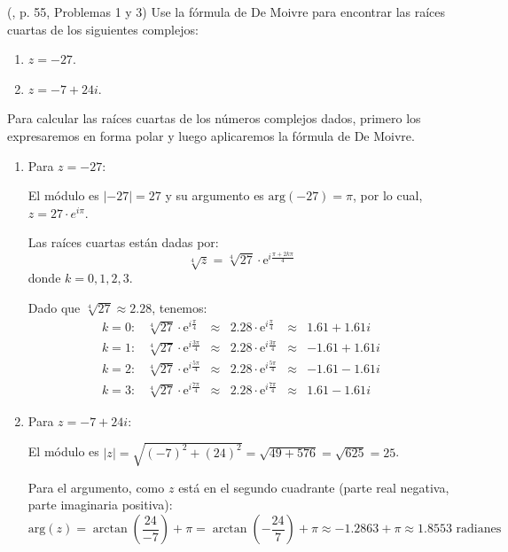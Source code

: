 \begin{prob}  (\cite{andreescu2014complex}, p. 55, Problemas 1 y 3) Use la fórmula de De Moivre para encontrar las raíces cuartas de los siguientes complejos:
\begin{multicols}{2}
\begin{enumerate}[$a)$]
\item $z=-27$.
\item $z=-7+24i$.
\end{enumerate}
\end{multicols}
\begin{myproof}
Para calcular las raíces cuartas de los números complejos dados, primero los expresaremos en forma polar y luego aplicaremos la fórmula de De Moivre.

\begin{enumerate}[$a)$]
\item Para $z=-27$:
   
   El módulo es $|-27| = 27$ y su argumento es $\text{arg}(-27) = \pi$, por lo cual, $z = 27\cdot e^{i\pi}$.
   
   Las raíces cuartas están dadas por:
   $$\sqrt[4]{z} = \sqrt[4]{27}\cdot \mathrm{e}^{i\frac{\pi+2k\pi}{4}}$$
   donde $k=0,1,2,3$.
   
   Dado que $\sqrt[4]{27} \approx 2.28$, tenemos:
   $$\begin{matrix}
   k=0: & \sqrt[4]{27}\cdot\mathrm{e}^{i\frac{\pi}{4}} &\approx& 2.28\cdot\mathrm{e}^{i\frac{\pi}{4}} &\approx& 1.61+1.61i \\
   k=1: & \sqrt[4]{27}\cdot\mathrm{e}^{i\frac{3\pi}{4}} &\approx& 2.28\cdot\mathrm{e}^{i\frac{3\pi}{4}} &\approx& -1.61+1.61i \\
   k=2: & \sqrt[4]{27}\cdot\mathrm{e}^{i\frac{5\pi}{4}} &\approx& 2.28\cdot\mathrm{e}^{i\frac{5\pi}{4}} &\approx& -1.61-1.61i \\
   k=3: & \sqrt[4]{27}\cdot\mathrm{e}^{i\frac{7\pi}{4}} &\approx& 2.28\cdot\mathrm{e}^{i\frac{7\pi}{4}} &\approx& 1.61-1.61i
   \end{matrix}$$

\item Para $z=-7+24i$:
   
   El módulo es $|z| = \sqrt{(-7)^2+(24)^2} = \sqrt{49+576} = \sqrt{625} = 25$.
   
   Para el argumento, como $z$ está en el segundo cuadrante (parte real negativa, parte imaginaria positiva):
   $$\text{arg}(z) = \arctan\left(\frac{24}{-7}\right) + \pi = \arctan(-\frac{24}{7}) + \pi \approx -1.2863 + \pi \approx 1.8553 \text{ radianes}$$
   

\end{enumerate}
\end{myproof}
\end{prob}
